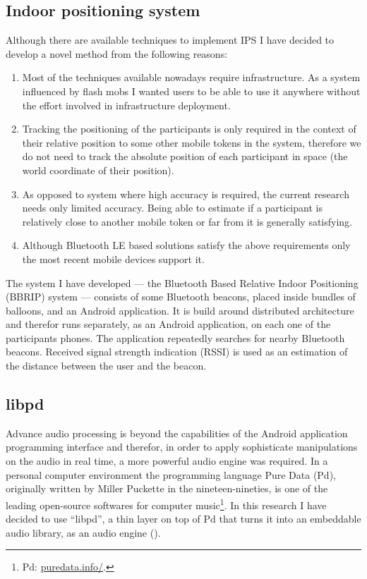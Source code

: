 \documentclass[a4paper,11pt]{article}
\begin{document}
\subsection{Indoor positioning system}\label{methods:ips}

Although there are available techniques to implement IPS I have decided to develop a novel method from the following reasons:

\begin{enumerate}
	\item Most of the techniques available nowadays require infrastructure.
	As a system influenced by flash mobs I wanted users to be able to use it anywhere without the effort involved in infrastructure deployment.
	\item Tracking the positioning of the participants is only required in the context of their relative position to some other mobile tokens in the system, therefore we do not need to track the absolute position of each participant in space (the world coordinate of their position).
	\item As opposed to system where high accuracy is required, the current research needs only limited accuracy.
	Being able to estimate if a participant is relatively close to another mobile token or far from it is generally satisfying.
	\item Although Bluetooth LE based solutions satisfy the above requirements only the most recent mobile devices support it.
\end{enumerate}

The system I have developed --- the Bluetooth Based Relative Indoor Positioning (BBRIP) system --- consists of some Bluetooth beacons, placed inside bundles of balloons, and an Android application.
It is build around distributed architecture and therefor runs separately, as an Android application, on each one of the participants phones.
The application repeatedly searches for nearby Bluetooth beacons.
Received signal strength indication (RSSI) is used as an estimation of the distance between the user and the beacon.

\subsection{libpd}\label{methods:libpd}

Advance audio processing is beyond the capabilities of the Android application programming interface and therefor, in order to apply sophisticate manipulations on the audio in real time, a more powerful audio engine was required.
In a personal computer environment the programming language Pure Data (Pd), originally written by Miller Puckette in the nineteen-nineties, is one of the leading open-source softwares for computer music\footnote{Pd: \href{http://puredata.info/}{puredata.info/}.}.
In this research I have decided to use ``libpd'', a thin layer on top of Pd that turns it into an embeddable audio library, as an audio engine (\cite[p. v]{brinkmann12}).
\end{document}
